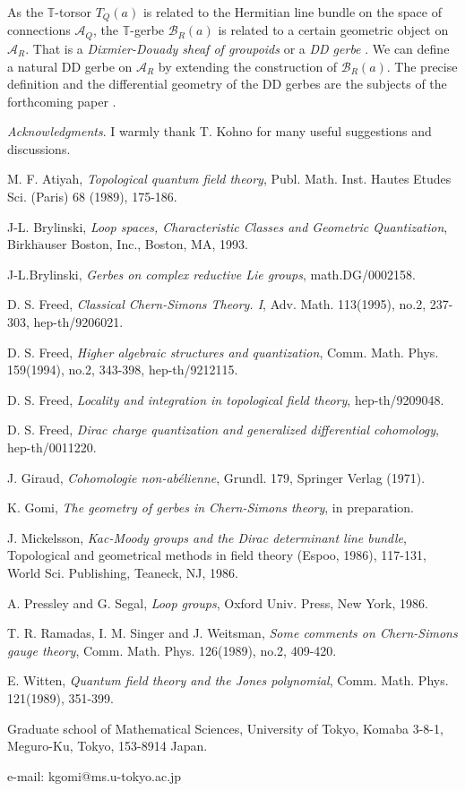 \documentclass[a4paper,a4paper]{article}
\theoremstyle{definition}
\theoremstyle{remark}
\newcommand{\T}{\mathbb{T}}
\newcommand{\A}{\mathcal{A}}
\newcommand{\B}{\mathcal{B}}
\begin{document}
\bigskip

As the $\T$-torsor $T_Q(a)$ is related to the Hermitian line bundle on the space of connections $\A_Q$, the $\T$-gerbe $\B_R(a)$ is related to a certain geometric object on $\A_R$. That is a \textit{Dixmier-Douady sheaf of groupoids} or a \textit{DD gerbe} \cite{Br1, Br2}. We can define a natural DD gerbe on $\A_R$ by extending the construction of $\B_R(a)$. The precise definition and the differential geometry of the DD gerbes are the subjects of the forthcoming paper \cite{Go}.

\bigskip

\textit{Acknowledgments}. I warmly thank T. Kohno for many useful suggestions and discussions.



\begin{thebibliography}{999}

M. F. Atiyah, 
\textit{Topological quantum field theory}, 
Publ. Math. Inst. Hautes Etudes Sci. (Paris) 68 (1989), 175-186.

J-L. Brylinski,
\textit{Loop spaces, Characteristic Classes and Geometric Quantization},
Birkh$\ddot{\textrm{a}}$user Boston, Inc., Boston, MA, 1993.

J-L.Brylinski,
\textit{Gerbes on complex reductive Lie groups},
math.DG/0002158.

D. S. Freed,
\textit{Classical Chern-Simons Theory. I},
Adv. Math. 113(1995), no.2, 237-303,
hep-th/9206021.

D. S. Freed,
\textit{Higher algebraic structures and quantization},
Comm. Math. Phys. 159(1994), no.2, 343-398,
hep-th/9212115.

D. S. Freed,
\textit{Locality and integration in topological field theory},
hep-th/9209048.

D. S. Freed,
\textit{Dirac charge quantization and generalized differential cohomology},
hep-th/0011220.

J. Giraud,
\textit{Cohomologie  non-ab\'elienne},
Grundl. 179, Springer Verlag (1971).

K. Gomi,
\textit{The geometry of gerbes in Chern-Simons theory},
in preparation.

J. Mickelsson,
\textit{Kac-Moody groups and the Dirac determinant line bundle},
Topological and geometrical methods in field theory (Espoo, 1986), 117-131, World Sci. Publishing, Teaneck, NJ, 1986.

A. Pressley and G. Segal,
\textit{Loop groups},
Oxford Univ. Press, New York, 1986.

T. R. Ramadas, I. M. Singer and J. Weitsman,
\textit{Some comments on Chern-Simons gauge theory},
Comm. Math. Phys. 126(1989), no.2, 409-420.

E. Witten,
\textit{Quantum field theory and the Jones polynomial},
Comm. Math. Phys. 121(1989), 351-399.

\end{thebibliography}

Graduate school of Mathematical Sciences, 
University of Tokyo, Komaba 3-8-1, Meguro-Ku, Tokyo, 153-8914 Japan.

e-mail: kgomi@ms.u-tokyo.ac.jp
\end{document}
